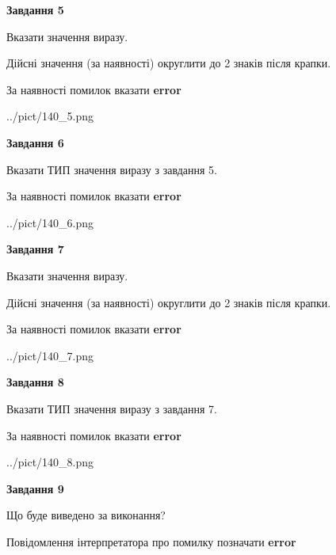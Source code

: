 \documentclass[11pt, ukrainian]{article}
\begin{document}
{\begin {large}
{\begin {center}\textbf{Завдання 5}\end {center}}\par
Вказати значення виразу. \par
Дійсні значення (за наявності) округлити до 2 знаків після крапки. \par
За наявності помилок вказати \textbf{error}

\begin{center}
	{../pict/140_5.png}
\end{center}
\newpage

{\begin {center}\textbf{Завдання 6}\end {center}}\par
Вказати ТИП значення виразу з завдання 5. \par
За наявності помилок вказати \textbf{error}

\begin{center}
	{../pict/140_6.png}
\end{center}
\newpage

{\begin {center}\textbf{Завдання 7}\end {center}}\par
Вказати значення виразу. \par
Дійсні значення (за наявності) округлити до 2 знаків після крапки. \par
За наявності помилок вказати \textbf{error}

\begin{center}
	{../pict/140_7.png}
\end{center}
\newpage

{\begin {center}\textbf{Завдання 8}\end {center}}\par
Вказати ТИП значення виразу з завдання 7. \par
За наявності помилок вказати \textbf{error}

\begin{center}
	{../pict/140_8.png}
\end{center}
\newpage

{\begin {center}\textbf{Завдання 9}\end {center}}\par
Що буде виведено за виконання? \par
Повідомлення інтерпретатора про помилку позначати \textbf{error}


\end{large}}
\end{document}

